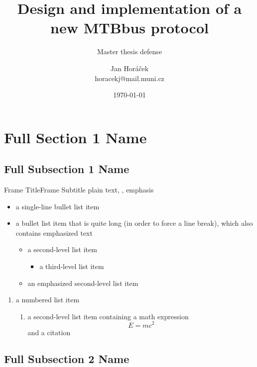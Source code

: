 \documentclass[aspectratio=169]{beamer}
\title[MTB v4]{Design and implementation of a new MTBbus protocol}
\subtitle[Thesis defense]{Master thesis defense}
\author[J. Horáček]{Jan Horáček\texorpdfstring{\\}{, }horacekj@mail.muni.cz}
\institute[FI MU]{Faculty of Informatics, Masaryk University}
\date{\today}
\begin{document}
\begin{frame}[plain]
\maketitle
\end{frame}

\section[Short Section 1 Name]{Full Section 1 Name}
\subsection[Short Subsection 1 Name]{Full Subsection 1 Name}

\begin{frame}{Frame Title}{Frame Subtitle}
plain text, , \alert{emphasis}
\begin{itemize}
  \item a single-line bullet list item
  \item a bullet list item that is quite long (in order to force a line break),
    which also contains \alert{emphasized text}
  \begin{itemize}
    \item a second-level list item
    \begin{itemize}
      \item a third-level list item
    \end{itemize}
    \item \alert{an emphasized second-level list item}
  \end{itemize}
\end{itemize}
\begin{enumerate}
  \item a numbered list item
  \begin{enumerate}
    \item a second-level list item containing a math expression
      \[ E = mc^2 \]
      and a citation \cite{einstein1905tragheit}
  \end{enumerate}
\end{enumerate}
\end{frame}

\subsection[Short Subsection 2 Name]{Full Subsection 2 Name}
\end{document}
